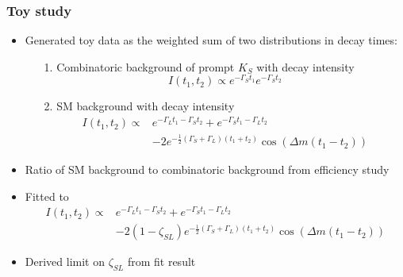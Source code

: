 \documentclass{beamer}
\begin{document}
\begin{frame}
\frametitle{Toy study}
\begin{itemize}
\item Generated toy data as the weighted sum of two distributions in decay times:
\begin{itemize}
\item[1.] Combinatoric background of prompt $K_S$ with decay intensity
\begin{equation*}
I(t_1,t_2) \propto e^{-\Gamma_S t_1}e^{-\Gamma_S t_2}  
\end{equation*}
\item[2.] SM background with decay intensity
\begin{align*}
I(t_1,t_2) \propto & e^{-\Gamma_L t_1 - \Gamma_S t_2} +e^{-\Gamma_S t_1 - \Gamma_L t_2}\\& - 2 e^{-\frac{1}{2}\left(\Gamma_S + \Gamma_L\right)\left(t_1+t_2\right)}\cos\left(\Delta m \left(t_1-t_2\right)\right)
\end{align*}
\end{itemize}
\item Ratio of SM background to combinatoric background from efficiency study
\item Fitted to 
\begin{align*}
I(t_1,t_2) \propto & e^{-\Gamma_L t_1 - \Gamma_S t_2} +e^{-\Gamma_S t_1 - \Gamma_L t_2}\\& - 2(1-\zeta_{SL}) e^{-\frac{1}{2}\left(\Gamma_S + \Gamma_L\right)\left(t_1+t_2\right)}\cos\left(\Delta m \left(t_1-t_2\right)\right)
\end{align*}
\item Derived limit on $\zeta_{SL}$ from fit result 
\end{itemize}
\end{frame}
\end{document}
